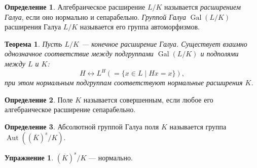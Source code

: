 \documentclass[12pt]{article}%
\newcommand{\ol}{\overline}
\DeclareMathOperator{\Aut}{Aut}
\DeclareMathOperator{\Gal}{Gal}
\newtheorem{Thm}{Теорема}[section]
\theoremstyle{remark}
\theoremstyle{definition}
\newtheorem{Exec}{Упражнение}
\newtheorem{Def}{Определение}[section]
\begin{document}
\begin{Def}
Алгебраическое расширение $L/K$ называется \emph{расширением Галуа}, если оно
нормально и сепарабельно. \emph{Группой Галуа} $\Gal(L/K)$ расширения Галуа
$L/K$ называется его группа автоморфизмов.
\end{Def}

\begin{Thm}
Пусть $L/K$ — конечное расширение Галуа. Существует взаимно однозначное
соответствие между подгруппами $\Gal(L/K)$ и подполями между $L$ и $K$:
\[
    H \leftrightarrow L^H (=\{x\in L \mid Hx=x\}),
\]
при этом нормальным подгруппам соответствуют нормальные расширения $K$.
\end{Thm}

\begin{Def}
Поле $K$ называется совершенным, если любое его алгебраическое расширение
сепарабельно.
\end{Def}

\begin{Def}
Абсолютной группой Галуа поля $K$ называется группа
$\Aut\left((\ol K)^s / K\right)$.
\end{Def}

\begin{Exec}
$(\ol K)^s / K$ — нормально.
\end{Exec}
\end{document}
